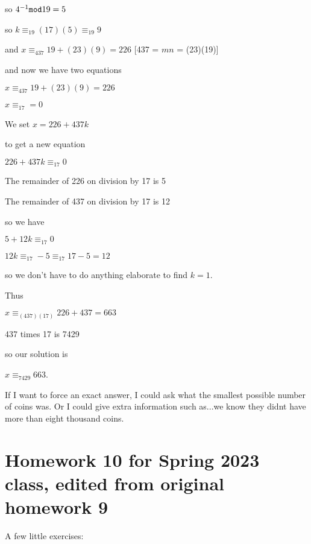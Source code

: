 \documentclass[12pt]{article}
\begin{document}
so $4^{-1}{\tt mod}19 = 5$

so $k \equiv_{19} (17)(5)\equiv_{19} 9$

and $x \equiv_{437} 19+(23)(9) = 226$ [437 = $mn$ = (23)(19)]


and now we have two equations

$x \equiv_{437} 19+(23)(9) = 226$ 

$x \equiv_{17} = 0$

We set $x=226+437k$

to get a new equation

$226+437k\equiv_{17}0$

The remainder of 226 on division by 17 is 5

The remainder of 437 on division by 17 is 12

so we have

$5+12k \equiv_{17}0$

$12k \equiv_{17} -5 \equiv_{17} 17-5 = 12$

so we don't have to do anything elaborate to find $k=1$.

Thus

$x \equiv_{(437)(17)} 226+437 = 663$

437 times 17 is 7429

so our solution is

$x \equiv_{7429} 663$.

If I want to force an exact answer, I could ask what the smallest possible number of coins was.  Or I could give extra information such as...we know they didnt have more than eight thousand coins.

\section{Homework 10 for Spring 2023 class, edited from original homework 9}

A few little exercises:
\end{document}
